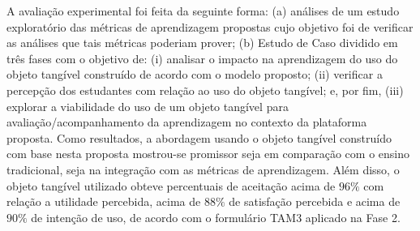 \begin{resumo}
A avaliação experimental foi feita da seguinte forma: (a) análises de um estudo exploratório das métricas de aprendizagem propostas cujo objetivo foi de verificar as análises que tais métricas poderiam prover; (b) Estudo de Caso dividido em três fases com o objetivo de: (i) analisar o impacto na aprendizagem do uso do objeto tangível construído de acordo com o modelo proposto; (ii) verificar a percepção dos estudantes com relação ao uso do objeto tangível; e, por fim, (iii) explorar a viabilidade do uso de um objeto tangível para avaliação/acompanhamento da aprendizagem no contexto da plataforma proposta. Como resultados, a abordagem usando o objeto tangível construído com base nesta proposta mostrou-se promissor seja em comparação com o ensino tradicional, seja na integração com as métricas de aprendizagem. Além disso, o objeto tangível utilizado obteve percentuais de aceitação acima de $96\%$ com relação a utilidade percebida, acima de $88\%$ de satisfação percebida e acima de $90\%$ de intenção de uso, de acordo com o formulário TAM3 aplicado na Fase 2.



\end{resumo}